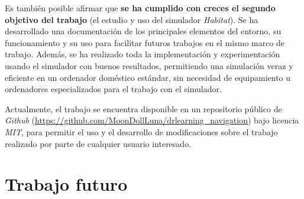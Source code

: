 Es también posible afirmar que \textbf{se ha cumplido con creces el segundo objetivo del trabajo} (el estudio y uso del simulador \textit{Habitat}). Se ha desarrollado una documentación de los principales elementos del entorno, su funcionamiento y su uso para facilitar futuros trabajos en el mismo marco de trabajo. Además, se ha realizado toda la implementación y experimentación usando el simulador con buenos resultados, permitiendo una simulación veraz y eficiente en un ordenador doméstico estándar, sin necesidad de equipamiento u ordenadores especializados para el trabajo con el simulador.

Actualmente, el trabajo se encuentra disponible en un repositorio público de \textit{Github} (\url{https://github.com/MoonDollLuna/drlearning_navigation}) bajo licencia \textit{MIT}, para permitir el uso y el desarrollo de modificaciones sobre el trabajo realizado por parte de cualquier usuario interesado.

\section{Trabajo futuro}

